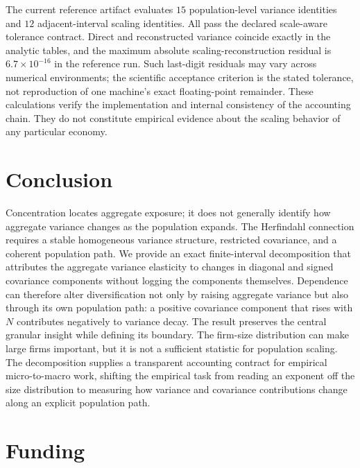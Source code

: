 \documentclass[a4paper,fleqn]{cas-dc}
\begin{document}
The current reference artifact evaluates $15$ population-level variance
identities and $12$ adjacent-interval scaling identities. All pass the
declared scale-aware tolerance contract. Direct and reconstructed
variance coincide exactly in the analytic tables, and the maximum
absolute scaling-reconstruction residual is
$6.7\times10^{-16}$ in the reference run. Such last-digit residuals may
vary across numerical environments; the scientific acceptance criterion
is the stated tolerance, not reproduction of one machine's exact
floating-point remainder. These calculations verify the implementation
and internal consistency of the accounting chain. They do not constitute
empirical evidence about the scaling behavior of any particular economy.

\section{Conclusion}
\label{sec:conclusion}

Concentration locates aggregate exposure; it does not generally identify
how aggregate variance changes as the population expands. The
Herfindahl connection requires a stable homogeneous variance structure,
restricted covariance, and a coherent population path. We provide an
exact finite-interval decomposition that attributes the aggregate
variance elasticity to changes in diagonal and signed covariance
components without logging the components themselves. Dependence can
therefore alter diversification not only by raising aggregate variance
but also through its own population path: a positive covariance
component that rises with $N$ contributes negatively to variance decay.
The result preserves the central granular insight while defining its
boundary. The firm-size distribution can make large firms important,
but it is not a sufficient statistic for population scaling. The
decomposition supplies a transparent accounting contract for empirical
micro-to-macro work, shifting the empirical task from reading an
exponent off the size distribution to measuring how variance and
covariance contributions change along an explicit population path.


\section*{Funding}
\end{document}
